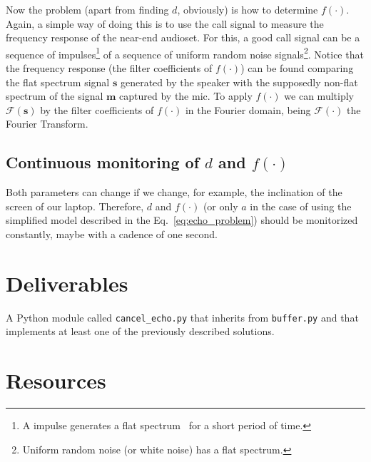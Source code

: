 Now the problem (apart from finding $d$, obviously) is how to
determine $f(\cdot)$. Again, a simple way of doing this is to use the
call signal to measure the frequency response of the near-end
audioset. For this, a good call signal can be a sequence of
impulses\footnote{A impulse generates a flat
  spectrum~\cite{kovacevic2013fourier,Oppenheim2} for a short period
  of time.} of a sequence of uniform random noise
signals\footnote{Uniform random noise (or white noise) has a flat
  spectrum.}. Notice that the frequency response (the filter
coefficients of $f(\cdot)$) can be found comparing the flat spectrum
signal ${\mathbf s}$ generated by the speaker with the supposedly
non-flat spectrum of the signal ${\mathbf m}$ captured by the mic.  To
apply $f(\cdot)$ we can multiply ${\mathcal F}({\mathbf s})$ by the
filter coefficients of $f(\cdot)$ in the Fourier domain, being
${\mathcal F}(\cdot)$ the Fourier Transform.

\subsection{Continuous monitoring of $d$ and $f(\cdot)$}

Both parameters can change if we change, for example, the inclination
of the screen of our laptop. Therefore, $d$ and $f(\cdot)$ (or only
$a$ in the case of using the simplified model described in the
Eq.~\eqref{eq:echo_problem}) should be monitorized constantly, maybe
with a cadence of one second.

\section{Deliverables}

A Python module called \texttt{cancel\_echo.py} that inherits from
\texttt{buffer.py} and that implements at least one of the previously
described solutions.

\section{Resources}



\begin{comment}
http://www.seas.ucla.edu/dsplab/index.html
https://es.mathworks.com/help/signal/ug/echo-cancelation.html
https://dsp.stackexchange.com/questions/26617/echo-cancelling-using-autocorrelation-function
https://pypi.org/project/adaptfilt/
http://www.diva-portal.org/smash/get/diva2:280596/fulltext01
https://github.com/ThomasHaubner/e2e_dnn_ad_control_for_lin_aec
https://scicoding.com/4-ways-of-calculating-autocorrelation-in-python/
\end{comment}